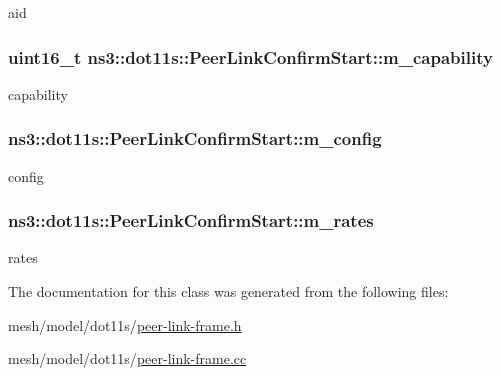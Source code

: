 aid 

\subsubsection[{\texorpdfstring{m\+\_\+capability}{m_capability}}]{\setlength{\rightskip}{0pt plus 5cm}uint16\+\_\+t ns3\+::dot11s\+::\+Peer\+Link\+Confirm\+Start\+::m\+\_\+capability\hspace{0.3cm}{\ttfamily [private]}}\hypertarget{classns3_1_1dot11s_1_1PeerLinkConfirmStart_a53aa2b2815f2090139f626ee2985e189}{}\label{classns3_1_1dot11s_1_1PeerLinkConfirmStart_a53aa2b2815f2090139f626ee2985e189}


capability 

\subsubsection[{\texorpdfstring{m\+\_\+config}{m_config}}]{ ns3\+::dot11s\+::\+Peer\+Link\+Confirm\+Start\+::m\+\_\+config\hspace{0.3cm}{\ttfamily [private]}}\hypertarget{classns3_1_1dot11s_1_1PeerLinkConfirmStart_ab7475e6d7ec070e3da15e13cbacc0f96}{}\label{classns3_1_1dot11s_1_1PeerLinkConfirmStart_ab7475e6d7ec070e3da15e13cbacc0f96}


config 

\subsubsection[{\texorpdfstring{m\+\_\+rates}{m_rates}}]{ ns3\+::dot11s\+::\+Peer\+Link\+Confirm\+Start\+::m\+\_\+rates\hspace{0.3cm}{\ttfamily [private]}}\hypertarget{classns3_1_1dot11s_1_1PeerLinkConfirmStart_a978ad2bf7e74e9d4e5010c87dbcf59c8}{}\label{classns3_1_1dot11s_1_1PeerLinkConfirmStart_a978ad2bf7e74e9d4e5010c87dbcf59c8}


rates 



The documentation for this class was generated from the following files\+:\begin{DoxyCompactItemize}
\item 
mesh/model/dot11s/\hyperlink{peer-link-frame_8h}{peer-\/link-\/frame.\+h}\item 
mesh/model/dot11s/\hyperlink{peer-link-frame_8cc}{peer-\/link-\/frame.\+cc}\end{DoxyCompactItemize}
